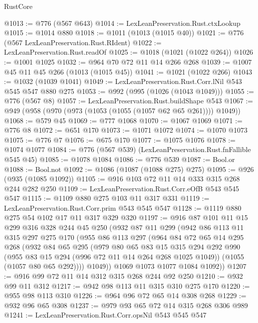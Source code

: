 \begin{lexlean}{RustCore}
\begin{coremodule}
{\begin{coremodule}
{{{{{{@1013 := @776 (@567 @643)
@1014 := LexLeanPreservation.Rust.ctxLookup
@1015 := @1014 @880
@1018 := @1011 (@1013 (@1015 @40))
@1021 := @776 (@567 LexLeanPreservation.Rust.RIdent)
@1022 := LexLeanPreservation.Rust.readOf
@1025 := @1018 (@1021 (@1022 @264))
@1026 := @1001 @1025
@1032 := @964 @70 @72 @11 @14 @266 @268
@1039 := @1007 @45 @11 @45 @266 (@1013 (@1015 @45))
@1041 := @1021 (@1022 @266)
@1043 := @1032 (@1039 @1041)
@1049 := LexLeanPreservation.Rust.Corr.lNil @543 @545 @547 @880 @275
@1053 := @992 (@995 (@1026 (@1043 @1049)))
@1055 := @776 (@567 @8)
@1057 := LexLeanPreservation.Rust.buildShape @543
@1067 := @949 (@958 (@970 (@973 (@1053 (@1055 (@1057 @62 @65 @261)))) @1049))
@1068 := @579 @45
@1069 := @777 @1068
@1070 := @1067 @1069
@1071 := @776 @8
@1072 := @651 @170
@1073 := @1071 @1072
@1074 := @1070 @1073
@1075 := @776 @7
@1076 := @675 @170
@1077 := @1075 @1076
@1078 := @1074 @1077
@1084 := @776 (@567 @539) (LexLeanPreservation.Rust.fnFallible @545 @45)
@1085 := @1078 @1084
@1086 := @776 @539
@1087 := Bool.or
@1088 := Bool.not
@1092 := @1086 (@1087 (@1088 @275) @275)
@1095 := @926 (@935 (@1085 @1092))
@1105 := @916 @103 @72 @11 @14 @333 @315 @268 @244 @282 @250
@1109 := LexLeanPreservation.Rust.Corr.eOfB @543 @545 @547
@1115 := @1109 @880 @275 @103 @11 @317 @331
@1119 := LexLeanPreservation.Rust.Corr.prim @543 @545 @547
@1128 := @1119 @880 @275 @54 @102 @17 @11 @317 @329 @320
@1197 := @916
    @87
    @101
    @11
    @15
    @299
    @316
    @328
    @244
    @45
    @250
    (@932
      @87
      @11
      @299
      (@942
        @86
        @113
        @11
        @315
        @297
        @275
        @170
        (@955
          @86
          @113
          @297
          (@964
            @84
            @72
            @65
            @14
            @295
            @268
            (@932
              @84
              @65
              @295
              (@979
                @80
                @65
                @83
                @15
                @315
                @294
                @292
                @990
                (@955 @83 @15 @294 (@996 @72 @11 @14 @264 @268 @1025 @1049))
                (@1055 (@1057 @80 @65 @292))))
            @1049))
        @1069
        @1073
        @1077
        @1084
        @1092))
@1207 := @916 @99 @72 @11 @14 @312 @315 @268 @244 @92 @250
@1210 := @932 @99 @11 @312
@1217 := @942 @98 @113 @11 @315 @310 @275 @170
@1220 := @955 @98 @113 @310
@1226 := @964 @96 @72 @65 @14 @308 @268
@1229 := @932 @96 @65 @308
@1237 := @979 @93 @65 @72 @14 @315 @268 @306 @989
@1241 := LexLeanPreservation.Rust.Corr.opsNil @543 @545 @547
}}}}}}
\end{coremodule}}
\end{coremodule}
\end{lexlean}
